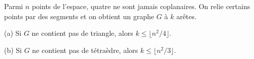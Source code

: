 Parmi $n$ points de l'espace, quatre ne sont jamais coplanaires. On relie certains points par des segments et on obtient un graphe $G$ à $k$ arêtes.

(a) Si $G$ ne contient pas de triangle, alors $k \leq \lfloor n^2/4 \rfloor$.

(b) Si $G$ ne contient pas de tétraèdre, alors $k \leq \lfloor n^2/3 \rfloor$.
